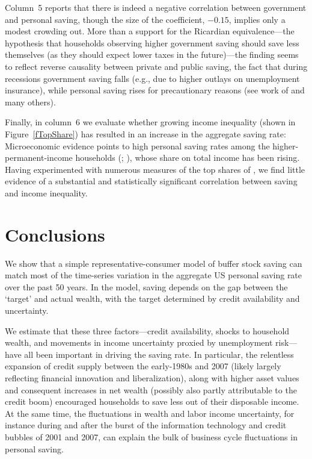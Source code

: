 \documentclass[titlepage]{\econtex}
\begin{document}
Column~5 reports that there is indeed a negative correlation between government and personal saving, though the size of the coefficient, $-0.15$, implies only a modest crowding out. More than a support for the Ricardian equivalence---the hypothesis that households observing higher government saving should save less themselves (as they should expect lower taxes in the future)---the finding seems to reflect reverse causality between private and public saving, the fact that during recessions government saving falls (e.g., due to higher outlays on unemployment insurance), while personal saving rises for precautionary reasons (see work of \cite{elmendorfMankiw} and many others).


Finally,  in column~6 we evaluate whether  growing income inequality (shown in Figure~\ref{fTopShare})
 has resulted in an increase in the aggregate saving rate: Microeconomic evidence
 points to high personal saving rates among the higher-permanent-income households
 (\cite{carroll:richsave}; \cite{dszRichSave}), whose share on total income has been rising.  Having experimented with numerous measures of the top shares of \cite{Piketty_Saez2003}, we find little evidence of a substantial and statistically significant correlation between saving and income inequality.


\section{Conclusions} \label{conclusions}

We show that a simple representative-consumer model of buffer stock saving can match most of the time-series variation in the aggregate US personal saving rate over the past 50 years. In the model, saving depends on the gap between the `target' and actual wealth, with the target determined by credit availability and uncertainty.

We estimate that these three factors---credit availability, shocks to household wealth, and movements in income uncertainty proxied by unemployment risk---have all been important in driving the saving rate. In particular, the relentless expansion of credit supply between the early-1980s and 2007 (likely largely reflecting financial innovation and liberalization), along with higher asset values and consequent increases in net wealth (possibly also partly attributable to the credit boom) encouraged households to save less out of their disposable income. At the same time, the fluctuations in wealth and labor income uncertainty, for instance during and after the burst of the information technology and credit bubbles of 2001 and 2007, can explain the bulk of business cycle fluctuations in personal saving.
\end{document}
